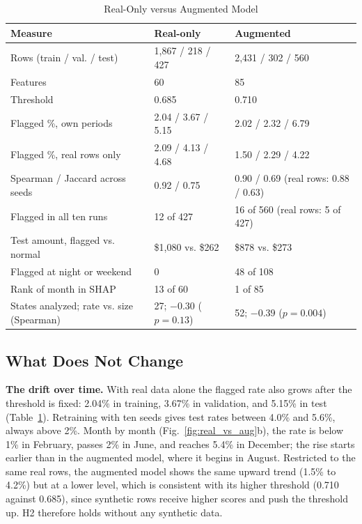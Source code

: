 \documentclass[journal]{IEEEtran}
\begin{document}
\begin{table}[!t]
\renewcommand{\arraystretch}{1.15}
\caption{Real-Only versus Augmented Model}
\label{tab:real_vs_aug}
\centering
\footnotesize
\begin{tabular}{p{}p{}p{}}
\hline
\textbf{Measure} & \textbf{Real-only} & \textbf{Augmented} \\
\hline
Rows (train / val. / test) & 1,867 / 218 / 427 & 2,431 / 302 / 560 \\
Features & 60 & 85 \\
Threshold & 0.685 & 0.710 \\
Flagged \%, own periods & 2.04 / 3.67 / 5.15 & 2.02 / 2.32 / 6.79 \\
Flagged \%, real rows only & 2.09 / 4.13 / 4.68 & 1.50 / 2.29 / 4.22 \\
Spearman / Jaccard across seeds & 0.92 / 0.75 & 0.90 / 0.69 (real rows: 0.88 / 0.63) \\
Flagged in all ten runs & 12 of 427 & 16 of 560 (real rows: 5 of 427) \\
Test amount, flagged vs. normal & \$1,080 vs. \$262 & \$878 vs. \$273 \\
Flagged at night or weekend & 0 & 48 of 108 \\
Rank of month in SHAP & 13 of 60 & 1 of 85 \\
States analyzed; rate vs. size (Spearman) & 27; $-0.30$ ($p=0.13$) & 52; $-0.39$ ($p=0.004$) \\
\hline
\end{tabular}
\end{table}

\subsection{What Does Not Change}

\textbf{The drift over time.} With real data alone the flagged rate also grows after the threshold is fixed: 2.04\% in training, 3.67\% in validation, and 5.15\% in test (Table~\ref{tab:real_vs_aug}). Retraining with ten seeds gives test rates between 4.0\% and 5.6\%, always above 2\%. Month by month (Fig.~\ref{fig:real_vs_aug}b), the rate is below 1\% in February, passes 2\% in June, and reaches 5.4\% in December; the rise starts earlier than in the augmented model, where it begins in August. Restricted to the same real rows, the augmented model shows the same upward trend (1.5\% to 4.2\%) but at a lower level, which is consistent with its higher threshold (0.710 against 0.685), since synthetic rows receive higher scores and push the threshold up. H2 therefore holds without any synthetic data.
\end{document}

